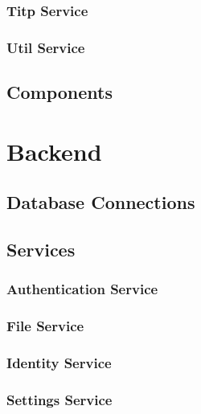 \subsubsection{Titp Service}

\subsubsection{Util Service}

\subsection{Components}

\section{Backend}

\subsection{Database Connections}

\subsection{Services}

\subsubsection{Authentication Service}

\subsubsection{File Service}

\subsubsection{Identity Service}

\subsubsection{Settings Service}
